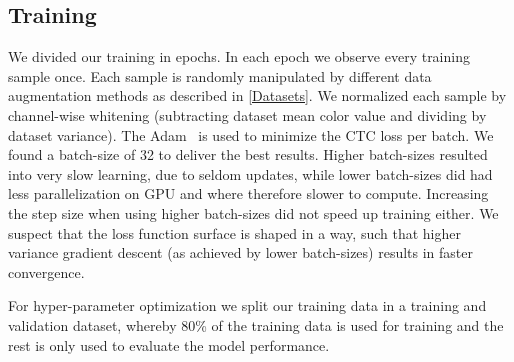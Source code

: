 \subsection{Training}\label{subsec:training}

We divided our training in epochs.
In each epoch we observe every training sample once.
Each sample is randomly manipulated by different data augmentation methods as described in \autoref{Datasets}.
We normalized each sample by channel-wise whitening (subtracting dataset mean color value and dividing by dataset variance).
The Adam~\cite{Adam} is used to minimize the CTC loss per batch.
We found a batch-size of 32 to deliver the best results.
Higher batch-sizes resulted into very slow learning, due to seldom updates, while lower batch-sizes did had less parallelization on GPU and where therefore slower to compute.
Increasing the step size when using higher batch-sizes did not speed up training either.
We suspect that the loss function surface is shaped in a way, such that higher variance gradient descent (as achieved by lower batch-sizes) results in faster convergence.

For hyper-parameter optimization we split our training data in a training and validation dataset, whereby 80\% of the training data is used for training and the rest is only used to evaluate the model performance.
